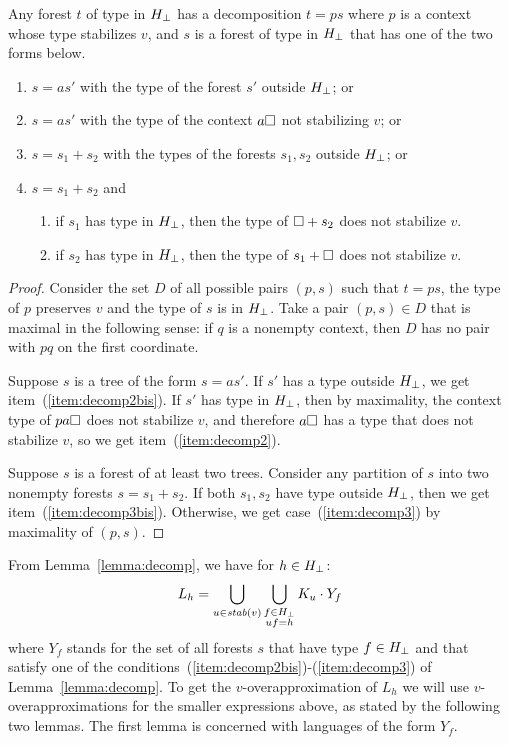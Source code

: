 \documentclass{LMCS}
\begin{document}
\begin{lem}\label{lemma:decomp}
  Any forest $t$ of type in ${H_\bot}$ has a decomposition $t=ps$  where $p$ is a context whose type stabilizes $v$, and  $s$ is a forest of type   in  ${H_\bot}$ that has one of the two forms below.
  \begin{enumerate}[\em(1)]
\item\label{item:decomp2bis} $s=as'$ with  the type of the forest $s'$ outside ${H_\bot}$; or
	\item\label{item:decomp2} $s=as'$ with  the type of the context $a\Box$ not stabilizing
	    $v$; or
	\item\label{item:decomp3bis} $s=s_1+s_2$ with the types of the forests $s_1,s_2$ outside ${H_\bot}$; or
\item\label{item:decomp3} $s=s_1+s_2$  and \begin{enumerate}[$\bullet$]
	\item if $s_1$ has  type in ${H_\bot}$, then the type of $\Box + s_2$  does not stabilize $v$.
		\item if $s_2$ has  type in ${H_\bot}$, then the type of $s_1 + \Box$  does not stabilize $v$.
\end{enumerate}
  \end{enumerate}
\end{lem}
\begin{proof}
Consider the set $D$ of all possible pairs $(p,s)$ such that $t=ps$, the type of $p$ preserves $v$ and the type of $s$ is in ${H_\bot}$.  Take a pair $(p,s) \in D$ that is maximal in the following sense: if $q$ is a nonempty context, then $D$ has no pair with $pq$ on the first coordinate. 


Suppose $s$ is a tree of the form $s=as'$.  If $s'$ has a type outside
${H_\bot}$, we get item~(\ref{item:decomp2bis}). If $s'$ has type in
${H_\bot}$, then by maximality, the context type of $pa\Box$ does not stabilize $v$,
and therefore $a \Box$ has a type that does not stabilize $v$, so we get
item~(\ref{item:decomp2}).

Suppose   $s$ is a forest of at least two trees.
Consider any partition of $s$ into two nonempty forests $s=s_1+s_2$.
If both $s_1,s_2$  have type outside ${H_\bot}$, then we get item~(\ref{item:decomp3bis}). Otherwise, we get case~(\ref{item:decomp3}) by maximality of $(p,s)$.
\end{proof}


From Lemma~\ref{lemma:decomp}, we have for $h \in {H_\bot}$:
\[
 L_h = \bigcup_{\substack{u \in \mathit{stab}(v)} } \bigcup_{\substack{f
       \in {H_\bot}  \\ uf=h}} K_u \cdot Y_f
\]
where $Y_f$ stands for the set of all forests $s$ that have type $f \in {H_\bot}$ and that
satisfy one of the conditions~(\ref{item:decomp2bis})-(\ref{item:decomp3}) of
Lemma~\ref{lemma:decomp}.
To get the $v$-overapproximation of $L_h$ we will use
$v$-overapproximations for the smaller expressions above, as stated by the
following two lemmas. The first lemma is concerned with languages of the form $Y_f$.
\end{document}

